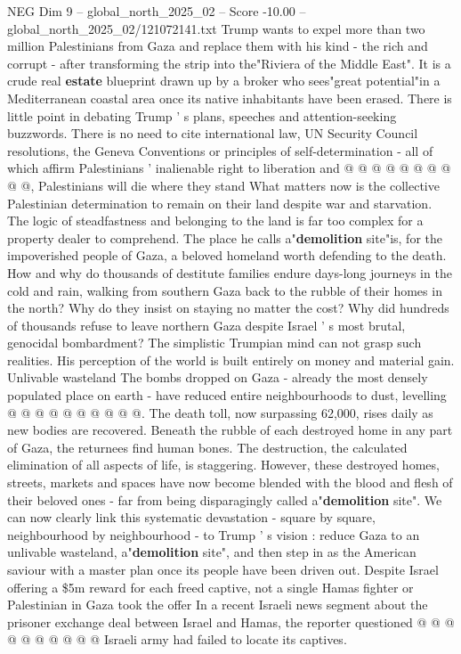 \begin{textsample}{NEG Dim 9 – global\_north\_2025\_02 – Score -10.00 – global\_north\_2025\_02/121072141.txt}
Trump wants to expel more than two million Palestinians from Gaza and replace them with his kind - the rich and corrupt - after transforming the strip into the"Riviera of the Middle East".
It is a crude real \textbf{estate} blueprint drawn up by a broker who sees"great potential"in a Mediterranean coastal area once its native inhabitants have been erased.
There is little point in debating Trump ' s plans, speeches and attention-seeking buzzwords.
There is no need to cite international law, UN Security Council resolutions, the Geneva Conventions or principles of self-determination - all of which affirm Palestinians ' inalienable right to liberation and @ @ @ @ @ @ @ @ @ @, Palestinians will die where they stand What matters now is the collective Palestinian determination to remain on their land despite war and starvation.
The logic of steadfastness and belonging to the land is far too complex for a property dealer to comprehend.
The place he calls a"\textbf{demolition} site"is, for the impoverished people of Gaza, a beloved homeland worth defending to the death.
How and why do thousands of destitute families endure days-long journeys in the cold and rain, walking from southern Gaza back to the rubble of their homes in the north?
Why do they insist on staying no matter the cost?
Why did hundreds of thousands refuse to leave northern Gaza despite Israel ' s most brutal, genocidal bombardment?
The simplistic Trumpian mind can not grasp such realities.
His perception of the world is built entirely on money and material gain.
Unlivable wasteland The bombs dropped on Gaza - already the most densely populated place on earth - have reduced entire neighbourhoods to dust, levelling @ @ @ @ @ @ @ @ @ @.
The death toll, now surpassing 62,000, rises daily as new bodies are recovered.
Beneath the rubble of each destroyed home in any part of Gaza, the returnees find human bones.
The destruction, the calculated elimination of all aspects of life, is staggering.
However, these destroyed homes, streets, markets and spaces have now become blended with the blood and flesh of their beloved ones - far from being disparagingly called a"\textbf{demolition} site".
We can now clearly link this systematic devastation - square by square, neighbourhood by neighbourhood - to Trump ' s vision : reduce Gaza to an unlivable wasteland, a"\textbf{demolition} site", and then step in as the American saviour with a master plan once its people have been driven out.
Despite Israel offering a \$5m reward for each freed captive, not a single Hamas fighter or Palestinian in Gaza took the offer In a recent Israeli news segment about the prisoner exchange deal between Israel and Hamas, the reporter questioned @ @ @ @ @ @ @ @ @ @ Israeli army had failed to locate its captives.

\end{textsample}
